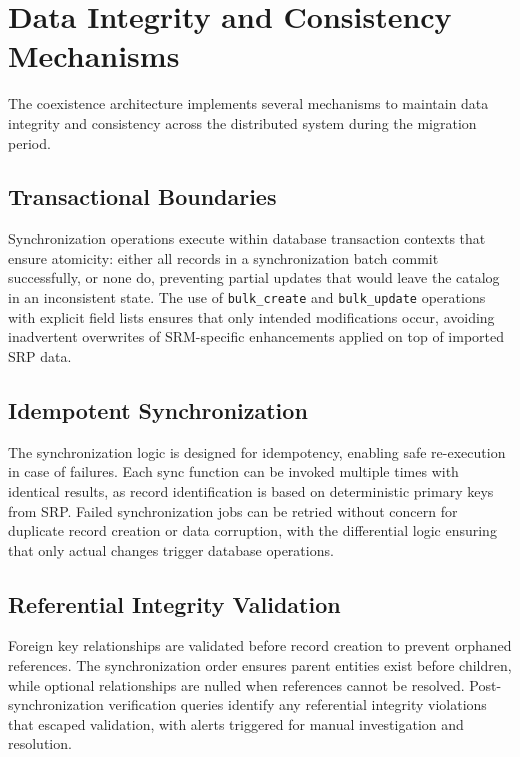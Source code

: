 \section{Data Integrity and Consistency Mechanisms}

The coexistence architecture implements several mechanisms to maintain data integrity and consistency across the distributed system during the migration period.

\subsection{Transactional Boundaries}

Synchronization operations execute within database transaction contexts that ensure atomicity: either all records in a synchronization batch commit successfully, or none do, preventing partial updates that would leave the catalog in an inconsistent state. The use of \texttt{bulk\_create} and \texttt{bulk\_update} operations with explicit field lists ensures that only intended modifications occur, avoiding inadvertent overwrites of SRM-specific enhancements applied on top of imported SRP data.

\subsection{Idempotent Synchronization}

The synchronization logic is designed for idempotency, enabling safe re-execution in case of failures. Each sync function can be invoked multiple times with identical results, as record identification is based on deterministic primary keys from SRP. Failed synchronization jobs can be retried without concern for duplicate record creation or data corruption, with the differential logic ensuring that only actual changes trigger database operations.

\subsection{Referential Integrity Validation}

Foreign key relationships are validated before record creation to prevent orphaned references. The synchronization order ensures parent entities exist before children, while optional relationships are nulled when references cannot be resolved. Post-synchronization verification queries identify any referential integrity violations that escaped validation, with alerts triggered for manual investigation and resolution.

